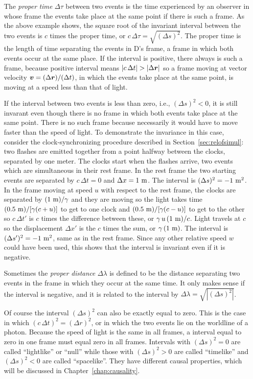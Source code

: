 The {\em proper time\/} $\Delta\tau$ between two events is the time
experienced by an observer in whose frame the events take place at the
same point if there is such a frame.  As the above example shows, the
square root of the invariant interval between the two events is $c$
times the proper time, or $c\,\Delta\tau=\sqrt{(\Delta s)^2}$. The
proper time is the length of time separating the events in D's frame,
a frame in which both events occur at the same place.  If the interval
is positive, there always is such a frame, because positive interval
means $|c\,\Delta t|>|\Delta\tv{r}|$ so a frame moving at vector
velocity $\mbox{\boldmath $v$}=(\Delta\mbox{\boldmath $r$})/(\Delta t)$, in which the events take
place at the same point, is moving at a speed less than that of light.

If the interval between two events is less than zero, i.e., $(\Delta
s)^2<0$, it is still invarant even though there is no frame in which
both events take place at the same point.  There is no such frame
because necessarily it would have to move faster than the speed of
light.  To demonstrate the invariance in this case, consider the
clock-synchronizing procedure described in
Section~\ref{sec:relofsimul}: two flashes are emitted together from a
point halfway between the clocks, separated by one meter.  The clocks
start when the flashes arrive, two events which are simultaneous in
their rest frame.  In the rest frame the two starting events are
separated by $c\,\Delta t=0$ and $\Delta x=1~{\rm m}$.  The interval is
$(\Delta s)^2=-1~{\rm m^2}$.  In the frame moving at speed $u$ with
respect to the rest frame, the clocks are separated by $(1~{\rm
m})/\gamma$ and they are moving so the light takes time $(0.5~{\rm
m})/[\gamma(c+u)]$ to get to one clock and $(0.5~{\rm m})/[\gamma(c-u)]$
to get to the other so $c\,\Delta t'$ is $c$ times the difference
between these, or $\gamma\,u\,(1~{\rm m})/c$.  Light travels at $c$ so
the displacement $\Delta x'$ is the $c$ times the sum, or
$\gamma\,(1~{\rm m})$.  The interval is $(\Delta s')^2=-1~{\rm m^2}$,
same as in the rest frame.  Since any other relative speed $w$ could
have been used, this shows that the interval is invariant even if it
is negative.

Sometimes the {\em proper distance\/} $\Delta\lambda$ is defined to be
the distance separating two events in the frame in which they occur at
the same time.  It only makes sense if the interval is negative, and
it is related to the interval by $\Delta\lambda=\sqrt{|(\Delta
s)^2|}$.

Of course the interval $(\Delta s)^2$ can also be exactly equal to
zero.  This is the case in which $(c\,\Delta t)^2=(\Delta r)^2$, or in
which the two events lie on the worldline of a photon.  Because the
speed of light is the same in all frames, a interval equal to zero in
one frame must equal zero in all frames.  Intervals with $(\Delta
s)^2=0$ are called ``lightlike'' or ``null'' while those with $(\Delta
s)^2>0$ are called ``timelike'' and $(\Delta s)^2<0$ are called
``spacelike''.  They have different causal properties, which will be
discussed in Chapter~\ref{chap:causality}.


